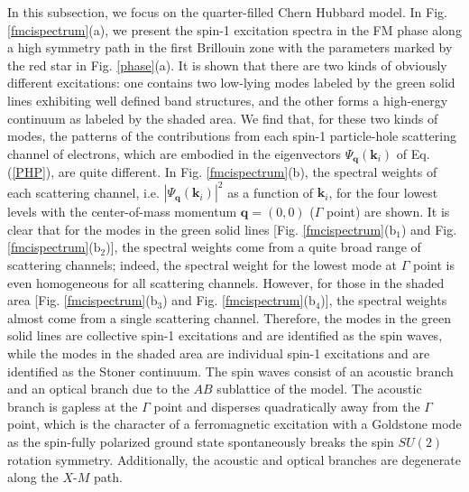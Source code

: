 \documentclass[amsmath,superscriptaddress,showpacs,aps,prb,twocolumn]{revtex4-1}
\begin{document}
\par In this subsection, we focus on the quarter-filled Chern Hubbard model. In Fig. \ref{fmcispectrum}(a), we present the spin-1 excitation spectra in the FM phase along a high symmetry path in the first Brillouin zone with the parameters marked by the red star in Fig. \ref{phase}(a). It is shown that there are two kinds of obviously different excitations: one contains two low-lying modes labeled by the green solid lines exhibiting well defined band structures,  and the other forms a high-energy continuum as labeled by the shaded area. We find that, for these two kinds of modes, the patterns of the contributions from each spin-1 particle-hole scattering channel of electrons, which are embodied in the eigenvectors $\Psi_{\mathbf{q}}(\mathbf{k}_i)$ of Eq. (\ref{PHP}), are quite different. In Fig. \ref{fmcispectrum}(b), the spectral weights of each scattering channel, i.e. $|\Psi_{\mathbf{q}}(\mathbf{k}_i)|^2$ as a function of $\mathbf{k}_i$, for the four lowest levels with the center-of-mass momentum $\mathbf{q}=(0,0)$ ($\Gamma$ point) are shown. It is clear that for the modes in the green solid lines [Fig. \ref{fmcispectrum}($\text{b}_1$) and Fig. \ref{fmcispectrum}($\text{b}_2$)], the spectral weights come from a quite broad range of scattering channels; indeed, the spectral weight for the lowest mode at $\Gamma$ point is even homogeneous for all scattering channels. However, for those in the shaded area [Fig. \ref{fmcispectrum}($\text{b}_3$) and Fig. \ref{fmcispectrum}($\text{b}_4$)], the spectral weights almost come from a single scattering channel. Therefore, the modes in the green solid lines are collective spin-1 excitations and are identified as the spin waves, while the modes in the shaded area are individual spin-1 excitations and are identified as the Stoner continuum. The spin waves consist of an acoustic branch and an optical branch due to the $AB$ sublattice of the model. The acoustic branch is gapless at the $\Gamma$ point and disperses quadratically away from the $\Gamma$ point, which is the character of a ferromagnetic excitation with a Goldstone mode as the spin-fully polarized ground state spontaneously breaks the spin $SU(2)$ rotation symmetry. Additionally, the acoustic and optical branches are degenerate along the $X$-$M$ path.
\end{document}

